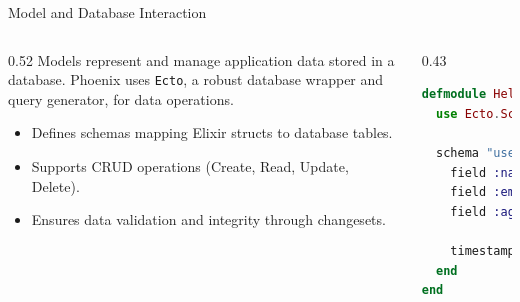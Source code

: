 \documentclass[aspectratio=169, table]{beamer}
\begin{document}
\begin{frame}[fragile]{Model and Database Interaction}
\vspace*{20pt}

\begin{columns}
  \begin{column}[T]{0.52\textwidth}
    Models represent and manage application data stored in a database.  
    Phoenix uses \texttt{Ecto}, a robust database wrapper and query generator, for data operations.

    \begin{itemize}
      \item Defines schemas mapping Elixir structs to database tables.
      \item Supports CRUD operations (Create, Read, Update, Delete).
      \item Ensures data validation and integrity through changesets.
    \end{itemize}
  \end{column}
 
  \begin{column}[T]{0.43\textwidth}
\begin{lstlisting}[language=Elixir]
defmodule Hello.Accounts.User do
  use Ecto.Schema

  schema "users" do
    field :name, :string
    field :email, :string
    field :age, :integer

    timestamps()
  end
end
\end{lstlisting}
  \end{column}
\end{columns}
\end{frame}
\end{document}
